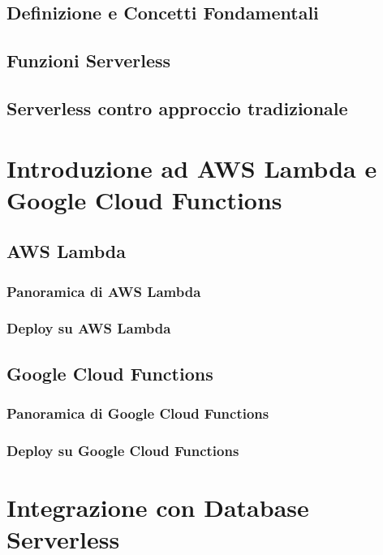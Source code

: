 \documentclass[12pt,a4paper,twoside]{book}
\begin{document}
\section{Definizione e Concetti Fondamentali}


\section{Funzioni Serverless}


\section{Serverless contro approccio tradizionale}


\chapter{Introduzione ad AWS Lambda e Google Cloud Functions}


\section{AWS Lambda}
\subsection{Panoramica di AWS Lambda}


\subsection{Deploy su AWS Lambda}


\section{Google Cloud Functions}
\subsection{Panoramica di Google Cloud Functions}


\subsection{Deploy su Google Cloud Functions}


\chapter{Integrazione con Database Serverless}
\end{document}
